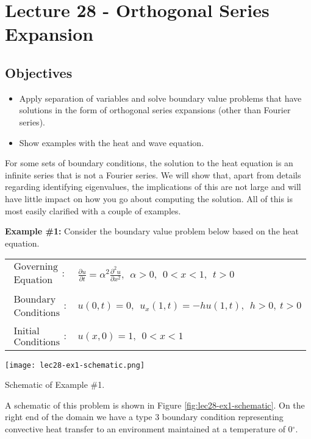\chapter{Lecture 28 - Orthogonal Series Expansion}
\label{ch:lec28}
\section{Objectives}
\begin{itemize}
\item Apply separation of variables and solve boundary value problems that have solutions in the form of orthogonal series expansions (other than Fourier series).
\item Show examples with the heat and wave equation.
\end{itemize}
\setcounter{lstannotation}{0} %

For some sets of boundary conditions, the solution to the heat equation is an infinite series that is not a Fourier series.  We will show that, apart from details regarding identifying eigenvalues, the implications of this are not large and will have little impact on how you go about computing the solution.  All of this is most easily clarified with a couple of examples.

\vspace{0.3cm}

\noindent\textbf{Example \#1:}  Consider the boundary value problem below based on the heat equation.
\begin{table}
\begin{tabular}{l l}
$\substack{\text{Governing} \\\text{Equation}}: $& $\frac{\partial u}{\partial t} = \alpha^2 \frac{\partial^2 u}{\partial x^2},  \ \ \alpha>0, \ \ 0<x<1, \ \ t>0$ \\
& \\
$\substack{\text{Boundary} \\ \text{Conditions}}: $& $u(0,t)=0, \ \ u_x(1,t) = -hu(1,t), \ \ h>0, \  t>0$\\
& \\
$\substack{\text{Initial} \\ \text{Conditions}}: $ & $u(x,0) = 1, \ \ 0<x<1 $ \\
\end{tabular}
\end{table}
\begin{marginfigure}
\texttt{[image: lec28-ex1-schematic.png]}
\caption{Schematic of Example \#1.}
\label{fig:lec28-ex1-schematic}
\end{marginfigure}
A schematic of this problem is shown in Figure \ref{fig:lec28-ex1-schematic}.  On the right end of the domain we have a type 3 boundary condition representing convective heat transfer to an environment maintained at a temperature of 0$^{\circ}$.

